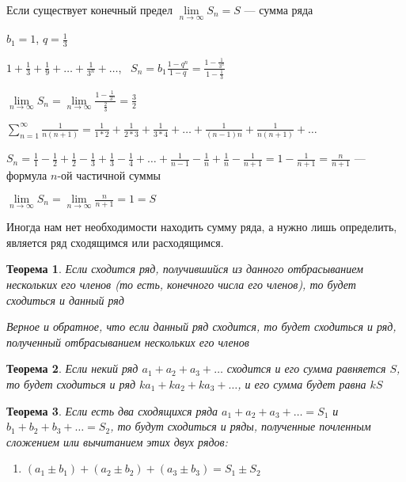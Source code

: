 \documentclass{article}
\newtheorem{theorem}{Теорема}
\begin{document}
Если существует конечный предел $\lim\limits_{n \to \infty} S_n = S$ — сумма ряда

\hfill

$b_1 = 1$, $q = \frac{1}{3}$

$1 + \frac{1}{3} + \frac{1}{9} + \dots + \frac{1}{3^{n}} + \dots$, \ $S_n = b_1 \frac{1 - q^{n}}{1 - q} = \frac{1 - \frac{1}{3^{n}}}{1 - \frac{1}{3}}$

$\lim\limits_{n \to \infty} S_{n} = \lim\limits_{n \to \infty} \frac{1 - \frac{1}{3^{n}}}{\frac{2}{3}} = \frac{3}{2}$

\hfill

\hfill

$\sum\limits_{n = 1}^{\infty} \frac{1}{n(n + 1)} = \frac{1}{1 * 2} + \frac{1}{2 * 3} + \frac{1}{3 * 4} + \dots + \frac{1}{(n - 1) n} + \frac{1}{n (n + 1)} + \dots$

$S_n = \frac{1}{1} - \frac{1}{2} + \frac{1}{2} - \frac{1}{3} + \frac{1}{3} - \frac{1}{4} + \dots + \frac{1}{n - 1} - \frac{1}{n} + \frac{1}{n} - \frac{1}{n + 1} = 1 - \frac{1}{n + 1} = \frac{n}{n + 1}$ — формула $n$-ой частичной суммы

$\lim\limits_{n \to \infty} S_{n} = \lim\limits_{n \to \infty} \frac{n}{n + 1} = 1 = S$


\hfill


Иногда нам нет необходимости находить сумму ряда, а нужно лишь определить, является ряд сходящимся или расходящимся.

\begin{theorem}
    Если сходится ряд, получившийся из данного отбрасыванием нескольких его членов (то есть, конечного числа его членов), то будет сходиться и данный ряд
    
    Верное и обратное, что если данный ряд сходится, то будет сходиться и ряд, полученный отбрасыванием нескольких его членов
\end{theorem}

\begin{theorem}
    Если некий ряд $a_1 + a_2 + a_3 + \dots$ сходится и его сумма равняется $S$, то будет сходиться и ряд $ka_1 + ka_2 + ka_3 + \dots$, и его сумма будет равна $k S$
\end{theorem}

\begin{theorem}
    Если есть два сходящихся ряда $a_1 + a_2 + a_3 + \dots = S_1$ и $b_1 + b_2 + b_3 + \dots = S_2$, то будут сходиться и ряды, полученные почленным сложением или вычитанием этих двух рядов:
    \begin{enumerate}
        \item $(a_1 \pm b_1) + (a_2 \pm b_2) + (a_3 \pm b_3) = S_1 \pm S_2$
    \end{enumerate}
\end{theorem}
\end{document}
